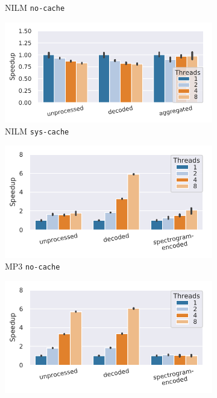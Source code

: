{\begin{figure}
\begin{subfigure}[c]{0.22\textwidth}
        \vspace{-18pt}
        \caption{NILM \texttt{no-cache}}
        \label{fig:speedup-nilm}
    \end{subfigure}
    \begin{subfigure}[c]{0.22\textwidth}
        \includegraphics[width=\textwidth]{figures/cream-pipeline/speedup-8000-samples-epoch-1.pdf}
        \vspace{-18pt}
        \caption{NILM \texttt{sys-cache}}
        \label{fig:speedup-epochs-nilm}
    \end{subfigure}
    \begin{subfigure}[c]{0.22\textwidth}
        \includegraphics[width=\textwidth]{figures/commonvoice-pipeline/speedup-8000-samples-epoch-0.pdf}
        \vspace{-18pt}
        \caption{MP3 \texttt{no-cache}}
        \label{fig:speedup-mp3}
    \end{subfigure}
        \begin{subfigure}[c]{0.22\textwidth}
        \includegraphics[width=\textwidth]{figures/commonvoice-pipeline/speedup-8000-samples-epoch-1.pdf}

\end{subfigure}
\end{figure}}
